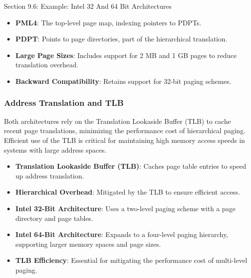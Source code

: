 \begin{notes}{Section 9.6: Example: Intel 32 And 64 Bit Architectures}
    \begin{highlight}
    
        \begin{itemize}
            \item \textbf{PML4}: The top-level page map, indexing pointers to PDPTs.
            \item \textbf{PDPT}: Points to page directories, part of the hierarchical translation.
            \item \textbf{Large Page Sizes}: Includes support for 2 MB and 1 GB pages to reduce translation overhead.
            \item \textbf{Backward Compatibility}: Retains support for 32-bit paging schemes.
        \end{itemize}
    
    \end{highlight}
    
    \subsubsection*{Address Translation and TLB}
    
    Both architectures rely on the Translation Lookaside Buffer (TLB) to cache recent page translations, minimizing the performance cost of hierarchical paging. Efficient use of the TLB is critical for 
    maintaining high memory access speeds in systems with large address spaces.
    
    \begin{highlight}
    
        \begin{itemize}
            \item \textbf{Translation Lookaside Buffer (TLB)}: Caches page table entries to speed up address translation.
            \item \textbf{Hierarchical Overhead}: Mitigated by the TLB to ensure efficient access.
        \end{itemize}
    
    \end{highlight}
    
    \begin{highlight}
    
        \begin{itemize}
            \item \textbf{Intel 32-Bit Architecture}: Uses a two-level paging scheme with a page directory and page tables.
            \item \textbf{Intel 64-Bit Architecture}: Expands to a four-level paging hierarchy, supporting larger memory spaces and page sizes.
            \item \textbf{TLB Efficiency}: Essential for mitigating the performance cost of multi-level paging.
        \end{itemize}
    

\end{highlight}
\end{notes}
